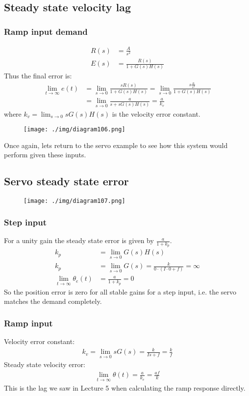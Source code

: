 \subsection{Steady state velocity lag}
\subsubsection{Ramp input demand}
\begin{align}
  R(s) & = \frac{A}{s^2}             \\
  E(s) & = \frac{R(s)}{1 + G(s)H(s)}
\end{align}
Thus the final error is:
\begin{align}
  \lim_{t\rightarrow \infty} e(t) & = \lim_{s\rightarrow 0} \frac{sR(s)}{1 + G(s)H(s)} = \lim_{s\rightarrow 0} \frac{s\frac{a}{s^2}}{1 + G(s)H(s)} \\
                                  & = \lim_{s\rightarrow 0} \frac{a}{s + sG(s) H(s)} = \frac{a}{k_v}
\end{align}
where $k_v = \lim_{s\rightarrow 0} sG(s) H(s)$ is the velocity error constant.
\begin{figure}[H]
  \centerline{\texttt{[image: ./img/diagram106.png]}}
  \caption{}
\end{figure}
Once again, lets return to the servo example to see how this system would perform given these inputs.
\subsection{Servo steady state error}
\begin{figure}[H]
  \centerline{\texttt{[image: ./img/diagram107.png]}}
  \caption{}
\end{figure}
\subsubsection{Step input}
For a unity gain the steady state error is given by $\frac{a}{1 + k_p}$.
\begin{align}
  k_p                                     & = \lim_{s\rightarrow 0} G(s)H(s)                                        \\
  k_p                                     & = \lim_{s\rightarrow 0} G(s) = \frac{k}{0\cdot (I\cdot 0 + f)} = \infty \\
  \lim_{t\rightarrow \infty} \theta_e (t) & = \frac{a}{1+k_p} = 0
\end{align}
So the position error is zero for all stable gains for a step input, i.e. the servo matches the demand completely.
\subsubsection{Ramp input}
Velocity error constant:
\begin{align}
  k_v = \lim_{s\rightarrow 0} sG(s) = \frac{k}{Is +f} = \frac{k}{f}
\end{align}
Steady state velocity error:
\begin{align}
  \lim_{t\rightarrow \infty} \theta (t) = \frac{a}{k_v} = \frac{af}{k}
\end{align}
This is the lag we saw in Lecture 5 when calculating the ramp response directly.
